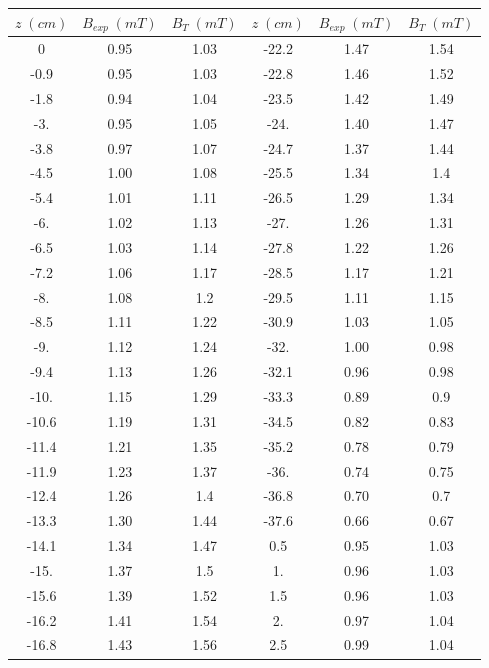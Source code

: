 \documentclass[a4paper,12pt,titlepage]{report}
\begin{document}
\begin{longtable}[ht]{|c|c|c|c|c|c|}
    \hline
    $z \; (cm)$ & $B_{exp} \; (mT)$ & $B_T \; (mT)$ & $z \; (cm)$ & $B_{exp} \; (mT)$ & $B_T \; (mT)$ \\ \hline
    0     & 0.95 & 1.03 & -22.2 & 1.47 & 1.54 \\ \hline
    -0.9  & 0.95 & 1.03 & -22.8 & 1.46 & 1.52 \\ \hline
    -1.8  & 0.94 & 1.04 & -23.5 & 1.42 & 1.49 \\ \hline
    -3.   & 0.95 & 1.05 & -24.  & 1.40 & 1.47 \\ \hline
    -3.8  & 0.97 & 1.07 & -24.7 & 1.37 & 1.44 \\ \hline
    -4.5  & 1.00 & 1.08 & -25.5 & 1.34 & 1.4  \\ \hline
    -5.4  & 1.01 & 1.11 & -26.5 & 1.29 & 1.34 \\ \hline
    -6.   & 1.02 & 1.13 & -27.  & 1.26 & 1.31 \\ \hline
    -6.5  & 1.03 & 1.14 & -27.8 & 1.22 & 1.26 \\ \hline
    -7.2  & 1.06 & 1.17 & -28.5 & 1.17 & 1.21 \\ \hline
    -8.   & 1.08 & 1.2  & -29.5 & 1.11 & 1.15 \\ \hline
    -8.5  & 1.11 & 1.22 & -30.9 & 1.03 & 1.05 \\ \hline
    -9.   & 1.12 & 1.24 & -32.  & 1.00 & 0.98 \\ \hline
    -9.4  & 1.13 & 1.26 & -32.1 & 0.96 & 0.98 \\ \hline
    -10.  & 1.15 & 1.29 & -33.3 & 0.89 & 0.9  \\ \hline
    -10.6 & 1.19 & 1.31 & -34.5 & 0.82 & 0.83 \\ \hline
    -11.4 & 1.21 & 1.35 & -35.2 & 0.78 & 0.79 \\ \hline
    -11.9 & 1.23 & 1.37 & -36.  & 0.74 & 0.75 \\ \hline
    -12.4 & 1.26 & 1.4  & -36.8 & 0.70 & 0.7  \\ \hline
    -13.3 & 1.30 & 1.44 & -37.6 & 0.66 & 0.67 \\ \hline
    -14.1 & 1.34 & 1.47 & 0.5   & 0.95 & 1.03 \\ \hline
    -15.  & 1.37 & 1.5  & 1.    & 0.96 & 1.03 \\ \hline
    -15.6 & 1.39 & 1.52 & 1.5   & 0.96 & 1.03 \\ \hline
    -16.2 & 1.41 & 1.54 & 2.    & 0.97 & 1.04 \\ \hline
    -16.8 & 1.43 & 1.56 & 2.5   & 0.99 & 1.04 \\ \hline

\end{longtable}
\end{document}

